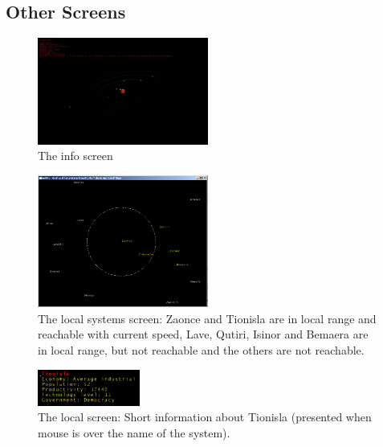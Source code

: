\documentclass[a4paper,11pt]{article}
\begin{document}
\subsection{Other Screens}

\begin{figure}[ht]
	\centering
		\includegraphics[width=0.50\textwidth]{infoview.jpg}
	  \caption{The info screen\label{info}}
\end{figure}

\begin{figure}[ht]
	\centering
		\includegraphics[width=0.50\textwidth]{localscreen.jpg}
	  \caption{The local systems screen: Zaonce and Tionisla are in local range and reachable with current speed, Lave, Qutiri, Isinor and Bemaera are in local range, but not reachable and the others are not reachable. \label{local}}
\end{figure}

\begin{figure}[ht]
	\centering
		\includegraphics[width=0.3\textwidth]{tionislahighlighted.jpg}
	  \caption{The local screen: Short information about Tionisla (presented when mouse is over the name of the system).\label{highlighting}}
\end{figure}
\end{document}
